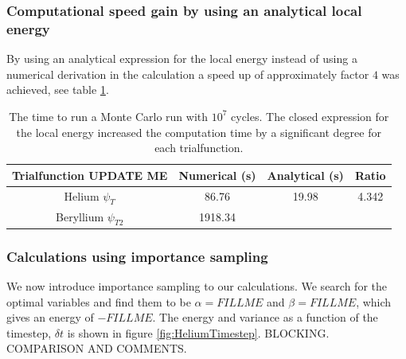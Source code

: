 		\subsubsection{Computational speed gain by using an analytical local energy}
			By using an analytical expression for the local energy instead of using a numerical derivation in the calculation a speed up of approximately factor \(4\) was achieved, see table \ref{tab:analyticVSNumeric}.

			\begin{table}
				\center
				\begin{tabular}{| c | c | c | c |}
				    \hline
				   	\textbf{Trialfunction UPDATE ME} & Numerical (s) & Analytical (s) & Ratio
				    \\ \hline
				    Helium $\psi_{T}$ & 86.76 & 19.98	& 4.342
				    \\	\hline
				    Beryllium $\psi_{T2}$ & 1918.34  &	 &
					    \\ \hline
				\end{tabular}
				\caption{The time to run a Monte Carlo run with \(10^7\) cycles. The closed expression for the local energy increased the computation time by a significant degree for each trialfunction. }
				\label{tab:analyticVSNumeric}
			\end{table}

		\subsubsection{Calculations using importance sampling}
			We now introduce importance sampling to our calculations. We search for the optimal variables and find them to be $\alpha=FILLME$ and $\beta=FILLME$, which gives an energy of $-FILLME$. The energy and variance as a function of the timestep, $\delta t$ is shown in figure \ref{fig:HeliumTimestep}. BLOCKING. COMPARISON AND COMMENTS. 

